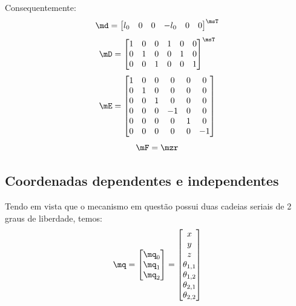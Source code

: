 \documentclass[]{politex}
\begin{document}
Consequentemente:
\begin{equation}
\md = \begin{bmatrix}
l_0 &
0 &
0 &
-l_0 &
0 &
0 
\end{bmatrix}^\msT
\end{equation}
\begin{equation}
\mD = \begin{bmatrix}
1 & 0 & 0 & 1 & 0 & 0 \\
0 & 1 & 0 & 0 & 1 & 0 \\
0 & 0 & 1 & 0 & 0 & 1 \\
\end{bmatrix}^\msT
\end{equation}
\begin{equation}
\mE = \begin{bmatrix}
1 & 0 & 0 & 0 & 0 & 0 \\
0 & 1 & 0 & 0 & 0 & 0 \\
0 & 0 & 1 & 0 & 0 & 0 \\
0 & 0 & 0 & -1 & 0 & 0 \\
0 & 0 & 0 & 0 & 1 & 0 \\
0 & 0 & 0 & 0 & 0 & -1 \\
\end{bmatrix}
\end{equation}
\begin{equation}
\mF = \mzr
\end{equation}

\subsection{Coordenadas dependentes e independentes}

Tendo em vista que o mecanismo em questão possui duas cadeias seriais de 2 graus de liberdade, temos:
\begin{equation}
\mq = \begin{bmatrix}
\mq_0 \\
\mq_1 \\
\mq_2
\end{bmatrix} =
\begin{bmatrix}
x \\
y \\
z \\
\theta_{1,1} \\
\theta_{1,2} \\
\theta_{2,1} \\
\theta_{2,2} \\
\end{bmatrix}
\end{equation}
\end{document}

